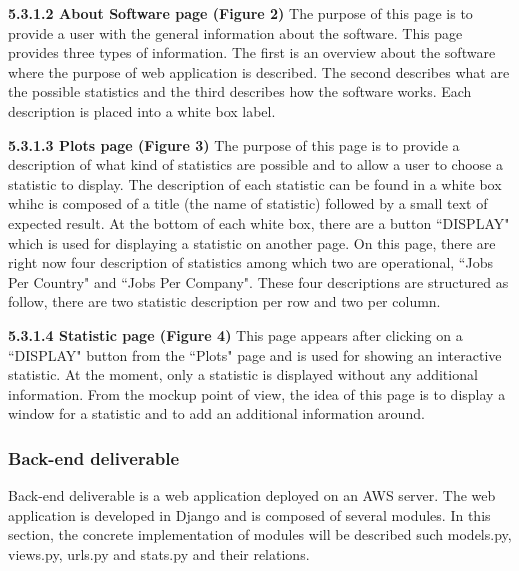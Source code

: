 \documentclass[conference,compsoc]{IEEEtran}
\begin{document}
\noindent
\newline\newline
\textbf{5.3.1.2 About Software page (Figure 2)}
\newline\newline
The purpose of this page is to provide a user with the general information about the software. This page provides three types of information. The first is an overview about the software where the purpose of web application is described. The second describes what are the possible statistics and the third describes how the software works. Each description is placed into a white box label. 

\noindent
\newline\newline
\textbf{5.3.1.3 Plots page (Figure 3)}
\newline\newline
The purpose of this page is to provide a description of what kind of statistics are possible and to allow a user to choose a statistic to display. The description of each statistic can be found in a white box whihc is composed of a title (the name of statistic) followed by a small text of expected result. 
\newline
At the bottom of each white box, there are a button ``DISPLAY" which is used for displaying a statistic on another page. 
                                                                                                                                                      \newline                  
On this page, there are right now four description of statistics among which two are operational, ``Jobs Per Country" and ``Jobs Per Company".  These four descriptions are structured as follow, there are two statistic description per row and two per column.                   

\noindent
\newline\newline
\textbf{5.3.1.4 Statistic page (Figure 4)}
\newline\newline
This page appears after clicking on a ``DISPLAY" button from the ``Plots" page and is used for showing an interactive statistic. At the moment, only a statistic is displayed without any additional information. From the mockup point of view, the idea of this page is to display a window for a statistic and to add an additional information around.  

\subsubsection{Back-end deliverable}    
Back-end deliverable is a web application deployed on an AWS server. The web application is developed in Django and is composed of several modules. In this section, the concrete implementation of modules will be described such models.py, views.py, urls.py and stats.py and their relations. 
\end{document}
